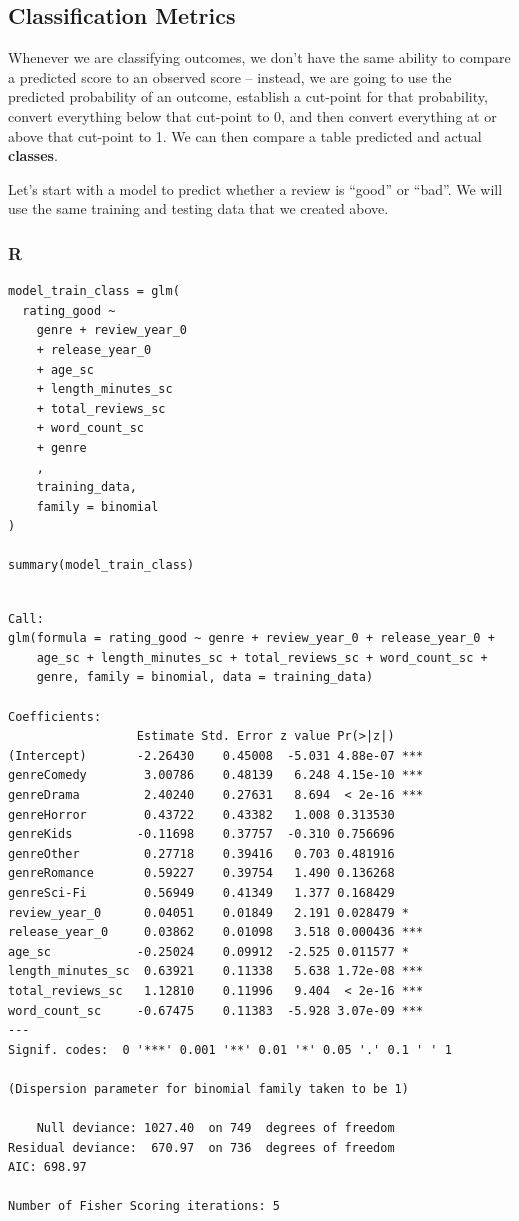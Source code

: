 \documentclass[
  letterpaper,
]{krantz}
\begin{document}
\subsection{Classification Metrics}\label{sec-knowing-class-metrics}

Whenever we are classifying outcomes, we don't have the same ability to
compare a predicted score to an observed score -- instead, we are going
to use the predicted probability of an outcome, establish a cut-point
for that probability, convert everything below that cut-point to 0, and
then convert everything at or above that cut-point to 1. We can then
compare a table predicted and actual \textbf{classes}.

Let's start with a model to predict whether a review is ``good'' or
``bad''. We will use the same training and testing data that we created
above.

\subsubsection{R}

\begin{verbatim}
model_train_class = glm(
  rating_good ~ 
    genre + review_year_0 
    + release_year_0 
    + age_sc 
    + length_minutes_sc 
    + total_reviews_sc 
    + word_count_sc 
    + genre     
    , 
    training_data, 
    family = binomial
)

summary(model_train_class)
\end{verbatim}

\begin{verbatim}

Call:
glm(formula = rating_good ~ genre + review_year_0 + release_year_0 + 
    age_sc + length_minutes_sc + total_reviews_sc + word_count_sc + 
    genre, family = binomial, data = training_data)

Coefficients:
                  Estimate Std. Error z value Pr(>|z|)    
(Intercept)       -2.26430    0.45008  -5.031 4.88e-07 ***
genreComedy        3.00786    0.48139   6.248 4.15e-10 ***
genreDrama         2.40240    0.27631   8.694  < 2e-16 ***
genreHorror        0.43722    0.43382   1.008 0.313530    
genreKids         -0.11698    0.37757  -0.310 0.756696    
genreOther         0.27718    0.39416   0.703 0.481916    
genreRomance       0.59227    0.39754   1.490 0.136268    
genreSci-Fi        0.56949    0.41349   1.377 0.168429    
review_year_0      0.04051    0.01849   2.191 0.028479 *  
release_year_0     0.03862    0.01098   3.518 0.000436 ***
age_sc            -0.25024    0.09912  -2.525 0.011577 *  
length_minutes_sc  0.63921    0.11338   5.638 1.72e-08 ***
total_reviews_sc   1.12810    0.11996   9.404  < 2e-16 ***
word_count_sc     -0.67475    0.11383  -5.928 3.07e-09 ***
---
Signif. codes:  0 '***' 0.001 '**' 0.01 '*' 0.05 '.' 0.1 ' ' 1

(Dispersion parameter for binomial family taken to be 1)

    Null deviance: 1027.40  on 749  degrees of freedom
Residual deviance:  670.97  on 736  degrees of freedom
AIC: 698.97

Number of Fisher Scoring iterations: 5
\end{verbatim}
\end{document}
